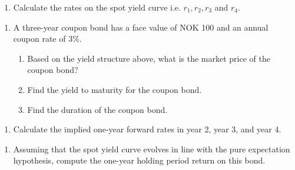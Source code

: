 \documentclass[12]{article}
\begin{document}
\begin{enumerate}
    \item[a)] Calculate the rates on the spot yield curve i.e.  $r_1, r_2, r_3$ and $r_4$.
\end{enumerate}




\color{black}
\begin{enumerate}
    \item[b)] A three-year coupon bond has a face value of NOK 100 and an annual coupon rate of 3\%.
    \begin{enumerate}
        \item[i] Based on the yield structure above, what is the market price of the coupon bond?
        \item[ii] Find the yield to maturity for the coupon bond.
        \item[iii] Find the duration of the coupon bond.
    \end{enumerate}
\end{enumerate}






\color{black}
\begin{enumerate}
    \item[c)] Calculate the implied one-year forward rates in year 2, year 3, and year 4.
\end{enumerate}



\color{black}
\begin{enumerate}
    \item[d)] Assuming that the spot yield curve evolves in line with the pure expectation hypothesis, compute the one-year holding period return on this bond.
\end{enumerate}



\color{black}
\end{document}
